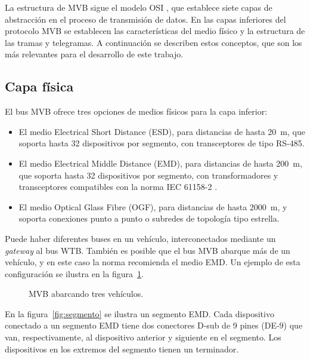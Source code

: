 La estructura de MVB sigue el modelo OSI \cite{ISO7498-1}, que establece siete capas de abstracción en el proceso de transmisión de datos.
En las capas inferiores del protocolo MVB se establecen las características del medio físico y la estructura de las tramas y telegramas.
A continuación se describen estos conceptos, que son los más relevantes para el desarrollo de este trabajo.

\subsection{Capa física}

El bus MVB ofrece tres opciones de medios físicos para la capa inferior:

\begin{itemize}
\item El medio Electrical Short Distance (ESD), para distancias de hasta 20~m, que soporta hasta 32 dispositivos por segmento, con transceptores de tipo RS-485.
\item El medio Electrical Middle Distance (EMD), para distancias de hasta 200~m, que soporta hasta  32 dispositivos por segmento, con transformadores y transceptores compatibles con la norma IEC 61158-2 \cite{iec61158_2}.
\item El medio Optical Glass Fibre (OGF), para distancias de hasta 2000~m, y soporta conexiones punto a punto o subredes de topología tipo estrella.
\end{itemize}

Puede haber diferentes buses en un vehículo, interconectados mediante un \textit{gateway} al bus WTB.
También es posible que el bus MVB abarque más de un vehículo, y en este caso la norma recomienda el medio EMD.
Un ejemplo de esta configuración se ilustra en la figura~\ref{fig:emd-esd-wtb}.

\begin{figure}[htbp]
	\centering
    {
        \fontsize{9pt}{9pt}\selectfont
        
    }
	\caption[MVB abarcando tres vehículos]{MVB abarcando tres vehículos.}
    \label{fig:emd-esd-wtb}
\end{figure}

En la figura~\ref{fig:segmento} se ilustra un segmento EMD.
Cada dispositivo conectado a un segmento EMD tiene dos conectores D-sub de 9 pines (DE-9) que van, respectivamente, al dispositivo anterior y siguiente en el segmento. Los dispositivos en los extremos del segmento tienen un terminador.

